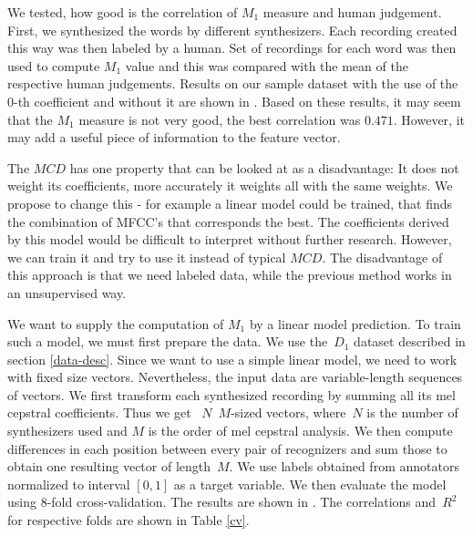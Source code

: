\par
We tested, how good is the correlation of $M_1$ measure and human judgement. First, we synthesized the words by different synthesizers. Each recording created this way was then labeled by a human. Set of recordings for each word was then used to compute $M_1$ value and this was compared with the mean of the respective human judgements. Results on our sample dataset with the use of the $0$-th coefficient and without it are shown in . Based on these results, it may seem that the $M_1$ measure is not very good, the best correlation was $0.471$. However, it may add a useful piece of information to the feature vector.
\par
{}
The $MCD$ has one property that can be looked at as a disadvantage: It does not weight its coefficients, more accurately it weights all with the same weights. We propose to change this - for example a linear model could be trained, that finds the combination of MFCC's that corresponds the best. The coefficients derived by this model would be difficult to interpret without further research. However, we can train it and try to use it instead of typical $MCD$. The disadvantage of this approach is that we need labeled data, while the previous method works in an unsupervised way.
\par
We want to supply the computation of $M_1$ by a linear model prediction. To train such a model, we must first prepare the data. We use the~$D_1$ dataset described in section \ref{data-desc}. Since we want to use a simple linear model, we need to work with fixed size vectors. Nevertheless, the input data are variable-length sequences of vectors. We first transform each synthesized recording by summing all its mel cepstral coefficients. Thus we get ~$N$~$M$-sized vectors, where~$N$ is the number of synthesizers used and $M$ is the order of mel cepstral analysis. We then compute differences in each position between every pair of recognizers and sum those to obtain one resulting vector of length~$M$. We use labels obtained from annotators normalized to interval $[0, 1]$ as a target variable. We then evaluate the model using 8-fold cross-validation. The results are shown in . The correlations and~$R^2$ for respective folds are shown in Table \ref{cv}.
